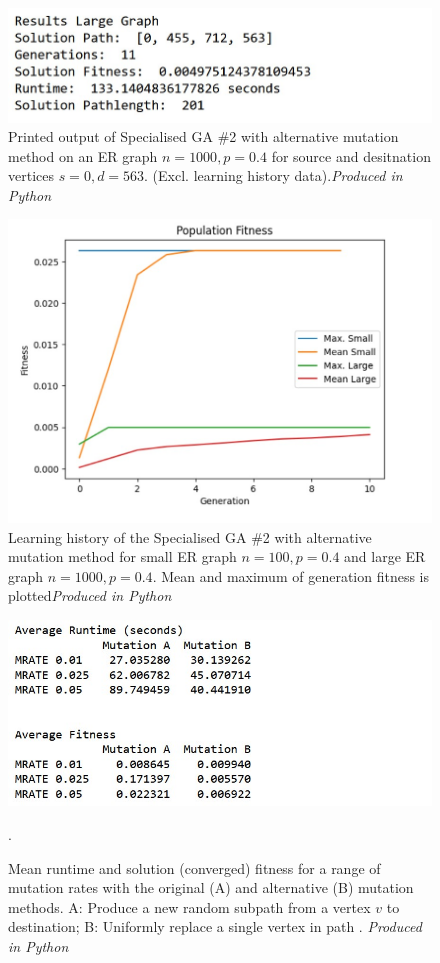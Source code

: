 \documentclass[
	a4paper, %
	10pt, %
	unnumberedsections, %
	twoside, %
]{LTJournalArticle}
\begin{document}
\begin{figure}[H]
	\includegraphics[width=\linewidth]{Figures/sssp/result_large_2.jpg}
	\caption{Printed output of Specialised GA \#2 with alternative mutation method on an ER graph \(n = 1000, p = 0.4\) for source and desitnation vertices \(s = 0, d = 563\). (Excl. learning history data).\emph{Produced in Python}}
	\label{fig:sssp_result_large_2}
\end{figure}

\begin{figure}[H]
	\includegraphics[width=\linewidth]{Figures/sssp/history_2.jpg}
	\caption{Learning history of the Specialised GA \#2 with alternative mutation method for small ER graph \(n = 100, p = 0.4\) and large ER graph \(n = 1000, p = 0.4\). Mean and maximum of generation fitness is plotted\emph{Produced in Python}}
	\label{fig:sssp_history_2}
\end{figure}

\begin{figure}
	\includegraphics[width=\linewidth]{Figures/sims/mutation/mutation_table.jpg}
	\caption{Mean runtime and solution (converged) fitness for a range of mutation rates with the original (A) and alternative (B) mutation methods. A: Produce a new random subpath from a vertex \(v\) to destination; B: Uniformly replace a single vertex in path .  \emph{Produced in Python}}. 
	\label{fig:mutation_table}
\end{figure}
\end{document}
